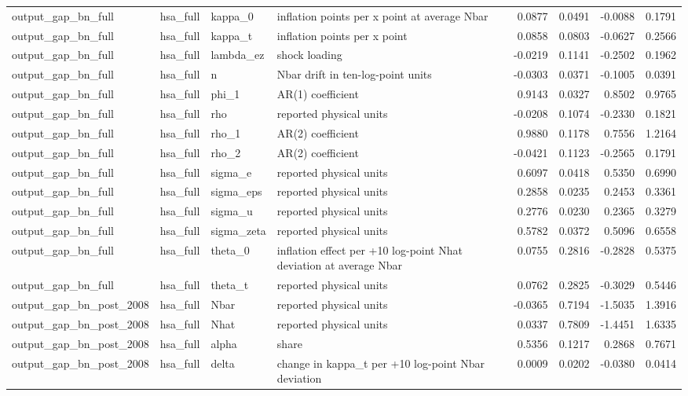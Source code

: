 \begin{tabular}{llllrrrr}
output\_gap\_bn\_full & hsa\_full & kappa\_0 & inflation points per x point at average Nbar & 0.0877 & 0.0491 & -0.0088 & 0.1791 \\
output\_gap\_bn\_full & hsa\_full & kappa\_t & inflation points per x point & 0.0858 & 0.0803 & -0.0627 & 0.2566 \\
output\_gap\_bn\_full & hsa\_full & lambda\_ez & shock loading & -0.0219 & 0.1141 & -0.2502 & 0.1962 \\
output\_gap\_bn\_full & hsa\_full & n & Nbar drift in ten-log-point units & -0.0303 & 0.0371 & -0.1005 & 0.0391 \\
output\_gap\_bn\_full & hsa\_full & phi\_1 & AR(1) coefficient & 0.9143 & 0.0327 & 0.8502 & 0.9765 \\
output\_gap\_bn\_full & hsa\_full & rho & reported physical units & -0.0208 & 0.1074 & -0.2330 & 0.1821 \\
output\_gap\_bn\_full & hsa\_full & rho\_1 & AR(2) coefficient & 0.9880 & 0.1178 & 0.7556 & 1.2164 \\
output\_gap\_bn\_full & hsa\_full & rho\_2 & AR(2) coefficient & -0.0421 & 0.1123 & -0.2565 & 0.1791 \\
output\_gap\_bn\_full & hsa\_full & sigma\_e & reported physical units & 0.6097 & 0.0418 & 0.5350 & 0.6990 \\
output\_gap\_bn\_full & hsa\_full & sigma\_eps & reported physical units & 0.2858 & 0.0235 & 0.2453 & 0.3361 \\
output\_gap\_bn\_full & hsa\_full & sigma\_u & reported physical units & 0.2776 & 0.0230 & 0.2365 & 0.3279 \\
output\_gap\_bn\_full & hsa\_full & sigma\_zeta & reported physical units & 0.5782 & 0.0372 & 0.5096 & 0.6558 \\
output\_gap\_bn\_full & hsa\_full & theta\_0 & inflation effect per +10 log-point Nhat deviation at average Nbar & 0.0755 & 0.2816 & -0.2828 & 0.5375 \\
output\_gap\_bn\_full & hsa\_full & theta\_t & reported physical units & 0.0762 & 0.2825 & -0.3029 & 0.5446 \\
output\_gap\_bn\_post\_2008 & hsa\_full & Nbar & reported physical units & -0.0365 & 0.7194 & -1.5035 & 1.3916 \\
output\_gap\_bn\_post\_2008 & hsa\_full & Nhat & reported physical units & 0.0337 & 0.7809 & -1.4451 & 1.6335 \\
output\_gap\_bn\_post\_2008 & hsa\_full & alpha & share & 0.5356 & 0.1217 & 0.2868 & 0.7671 \\
output\_gap\_bn\_post\_2008 & hsa\_full & delta & change in kappa\_t per +10 log-point Nbar deviation & 0.0009 & 0.0202 & -0.0380 & 0.0414 \\

\end{tabular}
